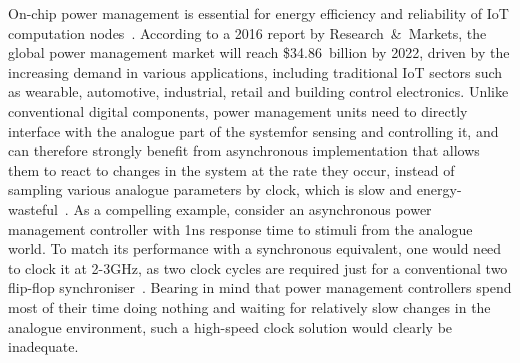\documentclass[british, journal]{IEEEtran}
\begin{document}
On-chip power management is essential for energy efficiency and reliability of
IoT computation nodes~\cite{7287733}. According to a 2016 report by
Research~\&~Markets, the global power management market will reach
\$34.86~billion
by 2022, driven by the increasing demand in various applications, including
traditional IoT sectors such as wearable, automotive, industrial, retail and
building control electronics. Unlike conventional digital components, power
management units need to directly interface with the analogue part of the systemfor sensing and controlling it, and can therefore strongly benefit from
asynchronous
implementation that allows them to react to changes in the system at the rate
they occur, instead of sampling various analogue parameters by clock, which is
slow and energy-wasteful~\cite{2014_sokolov_ftfc}\cite{sokolov2015design}.
As a compelling example, consider an asynchronous power management controller
with
1ns response time to stimuli from the analogue world. To match its performance
with a synchronous equivalent, one would need to clock it at 2-3GHz, as two
clock
cycles are required just for a conventional two flip-flop
synchroniser~\cite{2008_kinniment_synchronisation}. Bearing in mind that
power management controllers spend most of their time doing nothing and
waiting for relatively slow changes in the analogue environment, such
a high-speed clock solution would clearly be inadequate.
\end{document}
